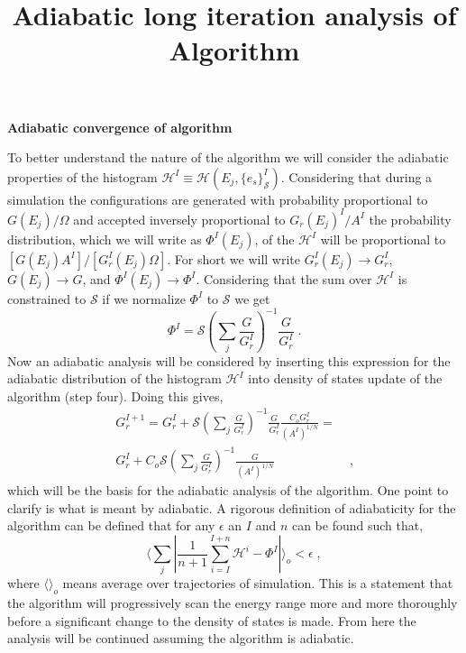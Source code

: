 \documentclass[a4paper,12pt]{article}
\title{Adiabatic long iteration analysis of Algorithm}
\begin{document}
\textbf{Adiabatic convergence of algorithm}

To better understand the nature of the algorithm we will consider the adiabatic properties of the histogram $\mathcal{H}^I\equiv \mathcal{H}(E_j, \{e_s\}_\mathcal{S}^I)$. Considering that during a simulation the configurations are generated with probability proportional to $G(E_j)/\Omega$ and accepted inversely proportional to $G_{r}(E_j)^I/A^I$ the probability distribution, which we will write as $\Phi^I(E_j)$, of the $\mathcal{H}^I$ will be proportional to $[G(E_j)A^I]/[G_r^I(E_j)\Omega]$. For short we will write $G_r^I(E_j) \rightarrow G_r^I$, $G(E_j)\rightarrow G$, and $\Phi^I(E_j)\rightarrow \Phi^I$.  Considering that the sum over $\mathcal{H}^I$ is constrained to $\mathcal{S}$ if we normalize $\Phi^I$ to $\mathcal{S}$ we get
\begin{equation}
\Phi^I = \mathcal{S}(\sum_{j}\frac{G}{G_r^I})^{-1}\frac{G}{G_r^I} \;.
\label{adiabatic_distribution}
\end{equation}
Now an adiabatic analysis will be considered by inserting this expression for the adiabatic distribution of the histogram $\mathcal{H}^I$ into density of states update of the algorithm (step four).  Doing this gives, 
\begin{equation}
\begin{split}
G_r^{I+1} = G_r^I  +   \mathcal{S}(\sum_{j}\frac{G}{G_r^I})^{-1}\frac{G}{G_r^I}\frac{C_oG_r^I}{(A^I)^{1/N}} =\\
 G_r^I  +   C_o\mathcal{S}(\sum_{j}\frac{G}{G_r^I})^{-1}\frac{G}{(A^I)^{1/N}} & \;,
\end{split}
\label{adiabatic_update}
\end{equation}
which will be the basis for the adiabatic analysis of the algorithm. One point to clarify is what is meant by adiabatic. A rigorous definition of adiabaticity for the algorithm can be defined that for any $\epsilon$ an  $I$ and $n$ can be found such that, 
\begin{equation}
  \langle \sum_j |\frac{1}{n+1}{\sum_{i=I}^{I+n}\mathcal{H}^i -  \Phi^I}| \rangle_o < \epsilon \;,
\end{equation}
where $\langle \rangle_o$ means average over trajectories of simulation. This is a statement that the algorithm will progressively scan the energy range more and more thoroughly before a significant change to the density of states is made.   From here the analysis will be continued assuming the algorithm is adiabatic. 
\end{document}
